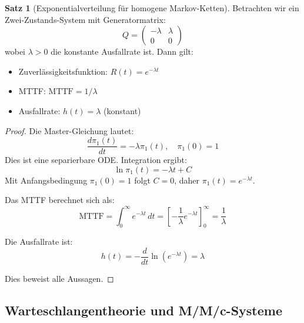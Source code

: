 \documentclass[a4paper,11pt]{article}
\theoremstyle{definition}
\newtheorem{satz}{Satz}
\newenvironment{beweis}{\begin{proof}}{\end{proof}}
\begin{document}
\begin{satz}[Exponentialverteilung für homogene Markov-Ketten]
    \label{satz:exponential_detailed}
    Betrachten wir ein Zwei-Zustands-System mit Generatormatrix:
    \[
        Q = \begin{pmatrix} -\lambda & \lambda \\ 0 & 0 \end{pmatrix}
    \]
    wobei $\lambda > 0$ die konstante Ausfallrate ist. Dann gilt:
    \begin{itemize}
        \item Zuverlässigkeitsfunktion: $R(t) = e^{-\lambda t}$
        \item MTTF: $\text{MTTF} = 1/\lambda$
        \item Ausfallrate: $h(t) = \lambda$ (konstant)
    \end{itemize}

    \begin{beweis}
        Die Master-Gleichung lautet:
        \[
            \frac{d\pi_1(t)}{dt} = -\lambda \pi_1(t), \quad \pi_1(0) = 1
        \]
        Dies ist eine separierbare ODE. Integration ergibt:
        \[
            \ln \pi_1(t) = -\lambda t + C
        \]
        Mit Anfangsbedingung $\pi_1(0) = 1$ folgt $C = 0$, daher $\pi_1(t) = e^{-\lambda t}$.

        Das MTTF berechnet sich als:
        \[
            \text{MTTF} = \int_0^{\infty} e^{-\lambda t} \, dt = \left[-\frac{1}{\lambda} e^{-\lambda t}\right]_0^{\infty} 
            = \frac{1}{\lambda}
        \]

        Die Ausfallrate ist:
        \[
            h(t) = -\frac{d}{dt} \ln(e^{-\lambda t}) = \lambda
        \]

        Dies beweist alle Aussagen.
    \end{beweis}
\end{satz}

\subsection{Warteschlangentheorie und M/M/c-Systeme}
\end{document}
